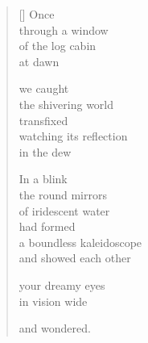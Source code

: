 \documentclass[14pt]{extbook}
\newcommand*{\centeredornament}{\centerline{\pgfornament[width=6cm]{88}}}
\begin{document}

\newpage

\vspace*{-15mm}
\centeredornament
\vspace*{-7mm}


\settowidth{\versewidth}{a boundless kaleidoscope}

\begin{verse}[\versewidth]
  Once \\
  through a window \\
  of the log cabin \\
  at dawn

  we caught \\
  the shivering world \\
  transfixed \\
  watching its reflection \\
  in the dew

  In a blink \\
  the round mirrors \\
  of iridescent water \\
  had formed \\
  a boundless kaleidoscope \\
  and showed each other

  your dreamy eyes \\
  in vision wide

  and wondered.
\end{verse}


\newpage

\vspace*{-15mm}
\centeredornament
\vspace*{-7mm}


\settowidth{\versewidth}{shadows pursue whispers}
\end{document}
